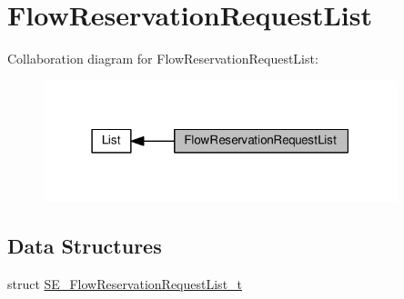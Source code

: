 \hypertarget{group__FlowReservationRequestList}{}\section{Flow\+Reservation\+Request\+List}
\label{group__FlowReservationRequestList}
Collaboration diagram for Flow\+Reservation\+Request\+List\+:\nopagebreak
\begin{figure}[H]
\begin{center}
\leavevmode
\includegraphics[width=291pt]{group__FlowReservationRequestList}
\end{center}
\end{figure}
\subsection*{Data Structures}
\begin{DoxyCompactItemize}
\item 
struct \hyperlink{structSE__FlowReservationRequestList__t}{S\+E\+\_\+\+Flow\+Reservation\+Request\+List\+\_\+t}
\end{DoxyCompactItemize}
